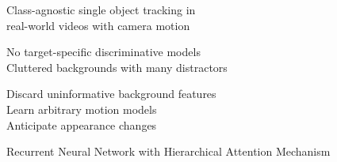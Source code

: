 
\vspace{1\baselineskip}

\begin{description}[labelsep=1em, leftmargin=!,labelwidth=\widthof{\bfseries Difficulties:},itemsep=.5em]
    \item[What:] Class-agnostic single object tracking in\\ real-world videos with camera motion
    
    \item[Difficulties:] No target-specific discriminative models\\ Cluttered backgrounds with many distractors
    
    \item[How:] Discard uninformative background features\\
                     Learn arbitrary motion models\\
                     Anticipate appearance changes
                     
    \item[Approach:] Recurrent Neural Network with Hierarchical Attention Mechanism
\end{description}